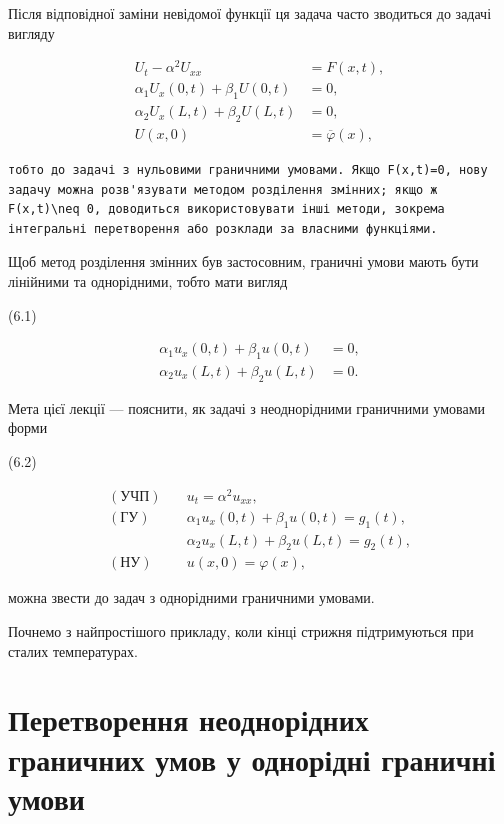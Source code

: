\documentclass[
  ukrainian,
]{article}
\begin{document}
Після відповідної заміни невідомої функції ця задача часто зводиться до
задачі вигляду

\[
\begin{aligned}
U_t - \alpha^2 U_{xx} &= F(x,t), \\
\alpha_1 U_x(0,t) + \beta_1 U(0,t) &= 0, \\
\alpha_2 U_x(L,t) + \beta_2 U(L,t) &= 0, \\
U(x,0) &= \overline{\varphi}(x),
\end{aligned}
\]

\begin{verbatim}
тобто до задачі з нульовими граничними умовами. Якщо F(x,t)=0, нову задачу можна розв'язувати методом розділення змінних; якщо ж F(x,t)\neq 0, доводиться використовувати інші методи, зокрема інтегральні перетворення або розклади за власними функціями.
\end{verbatim}

Щоб метод розділення змінних був застосовним, граничні умови мають бути
лінійними та однорідними, тобто мати вигляд

(6.1)

\[
\begin{aligned}
\alpha_1 u_x(0,t) + \beta_1 u(0,t) &= 0, \\
\alpha_2 u_x(L,t) + \beta_2 u(L,t) &= 0.
\end{aligned}
\]

Мета цієї лекції --- пояснити, як задачі з неоднорідними граничними
умовами форми

(6.2)

\[
\begin{aligned}
(\text{УЧП})\quad & u_t = \alpha^2 u_{xx}, \\
(\text{ГУ})\quad & \alpha_1 u_x(0,t) + \beta_1 u(0,t) = g_1(t), \\
& \alpha_2 u_x(L,t) + \beta_2 u(L,t) = g_2(t), \\
(\text{НУ})\quad & u(x,0) = \varphi(x),
\end{aligned}
\]

можна звести до задач з однорідними граничними умовами.

Почнемо з найпростішого прикладу, коли кінці стрижня підтримуються при
сталих температурах.

\section{Перетворення неоднорідних граничних умов у однорідні граничні
умови}\label{ux43fux435ux440ux435ux442ux432ux43eux440ux435ux43dux43dux44f-ux43dux435ux43eux434ux43dux43eux440ux456ux434ux43dux438ux445-ux433ux440ux430ux43dux438ux447ux43dux438ux445-ux443ux43cux43eux432-ux443-ux43eux434ux43dux43eux440ux456ux434ux43dux456-ux433ux440ux430ux43dux438ux447ux43dux456-ux443ux43cux43eux432ux438}
\end{document}
